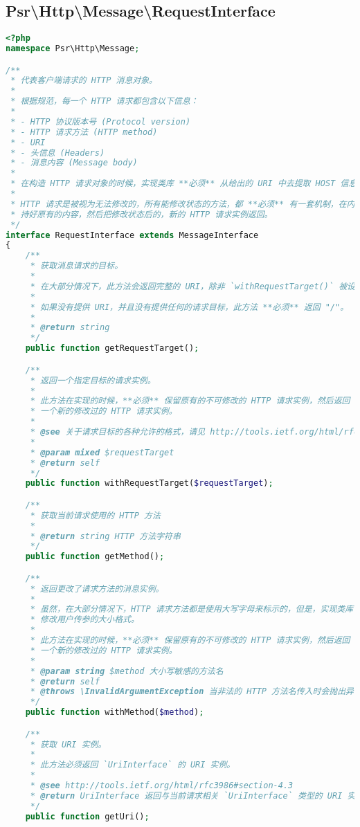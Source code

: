 \subsection{Psr\textbackslash Http\textbackslash Message\textbackslash RequestInterface}




\begin{lstlisting}[language=PHP]
<?php
namespace Psr\Http\Message;

/**
 * 代表客户端请求的 HTTP 消息对象。
 *
 * 根据规范，每一个 HTTP 请求都包含以下信息：
 *
 * - HTTP 协议版本号 (Protocol version)
 * - HTTP 请求方法 (HTTP method)
 * - URI
 * - 头信息 (Headers)
 * - 消息内容 (Message body)
 *
 * 在构造 HTTP 请求对象的时候，实现类库 **必须** 从给出的 URI 中去提取 HOST 信息。
 *
 * HTTP 请求是被视为无法修改的，所有能修改状态的方法，都 **必须** 有一套机制，在内部保
 * 持好原有的内容，然后把修改状态后的，新的 HTTP 请求实例返回。
 */
interface RequestInterface extends MessageInterface
{
    /**
     * 获取消息请求的目标。
     *
     * 在大部分情况下，此方法会返回完整的 URI，除非 `withRequestTarget()` 被设置过。
     *
     * 如果没有提供 URI，并且没有提供任何的请求目标，此方法 **必须** 返回 "/"。
     *
     * @return string
     */
    public function getRequestTarget();

    /**
     * 返回一个指定目标的请求实例。
     *
     * 此方法在实现的时候，**必须** 保留原有的不可修改的 HTTP 请求实例，然后返回
     * 一个新的修改过的 HTTP 请求实例。
     *
     * @see 关于请求目标的各种允许的格式，请见 http://tools.ietf.org/html/rfc7230#section-2.7 
     * 
     * @param mixed $requestTarget
     * @return self
     */
    public function withRequestTarget($requestTarget);

    /**
     * 获取当前请求使用的 HTTP 方法
     *
     * @return string HTTP 方法字符串
     */
    public function getMethod();

    /**
     * 返回更改了请求方法的消息实例。
     *
     * 虽然，在大部分情况下，HTTP 请求方法都是使用大写字母来标示的，但是，实现类库 **一定不可**
     * 修改用户传参的大小格式。
     * 
     * 此方法在实现的时候，**必须** 保留原有的不可修改的 HTTP 请求实例，然后返回
     * 一个新的修改过的 HTTP 请求实例。
     *
     * @param string $method 大小写敏感的方法名
     * @return self
     * @throws \InvalidArgumentException 当非法的 HTTP 方法名传入时会抛出异常。
     */
    public function withMethod($method);

    /**
     * 获取 URI 实例。
     *
     * 此方法必须返回 `UriInterface` 的 URI 实例。
     *
     * @see http://tools.ietf.org/html/rfc3986#section-4.3
     * @return UriInterface 返回与当前请求相关 `UriInterface` 类型的 URI 实例。
     */
    public function getUri();


\end{lstlisting}
